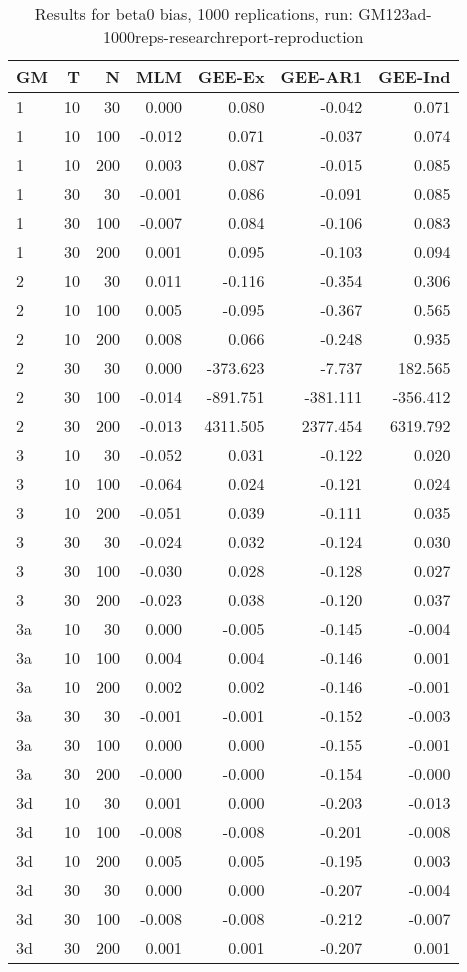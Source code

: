 \begin{table}[ht]
\centering
\begin{tabular}{lrrrrrr}
  \hline
GM & T & N & MLM & GEE-Ex & GEE-AR1 & GEE-Ind \\ 
  \hline
1 & 10 & 30 & 0.000 & 0.080 & -0.042 & 0.071 \\ 
  1 & 10 & 100 & -0.012 & 0.071 & -0.037 & 0.074 \\ 
  1 & 10 & 200 & 0.003 & 0.087 & -0.015 & 0.085 \\ 
  1 & 30 & 30 & -0.001 & 0.086 & -0.091 & 0.085 \\ 
  1 & 30 & 100 & -0.007 & 0.084 & -0.106 & 0.083 \\ 
  1 & 30 & 200 & 0.001 & 0.095 & -0.103 & 0.094 \\ 
  2 & 10 & 30 & 0.011 & -0.116 & -0.354 & 0.306 \\ 
  2 & 10 & 100 & 0.005 & -0.095 & -0.367 & 0.565 \\ 
  2 & 10 & 200 & 0.008 & 0.066 & -0.248 & 0.935 \\ 
  2 & 30 & 30 & 0.000 & -373.623 & -7.737 & 182.565 \\ 
  2 & 30 & 100 & -0.014 & -891.751 & -381.111 & -356.412 \\ 
  2 & 30 & 200 & -0.013 & 4311.505 & 2377.454 & 6319.792 \\ 
  3 & 10 & 30 & -0.052 & 0.031 & -0.122 & 0.020 \\ 
  3 & 10 & 100 & -0.064 & 0.024 & -0.121 & 0.024 \\ 
  3 & 10 & 200 & -0.051 & 0.039 & -0.111 & 0.035 \\ 
  3 & 30 & 30 & -0.024 & 0.032 & -0.124 & 0.030 \\ 
  3 & 30 & 100 & -0.030 & 0.028 & -0.128 & 0.027 \\ 
  3 & 30 & 200 & -0.023 & 0.038 & -0.120 & 0.037 \\ 
  3a & 10 & 30 & 0.000 & -0.005 & -0.145 & -0.004 \\ 
  3a & 10 & 100 & 0.004 & 0.004 & -0.146 & 0.001 \\ 
  3a & 10 & 200 & 0.002 & 0.002 & -0.146 & -0.001 \\ 
  3a & 30 & 30 & -0.001 & -0.001 & -0.152 & -0.003 \\ 
  3a & 30 & 100 & 0.000 & 0.000 & -0.155 & -0.001 \\ 
  3a & 30 & 200 & -0.000 & -0.000 & -0.154 & -0.000 \\ 
  3d & 10 & 30 & 0.001 & 0.000 & -0.203 & -0.013 \\ 
  3d & 10 & 100 & -0.008 & -0.008 & -0.201 & -0.008 \\ 
  3d & 10 & 200 & 0.005 & 0.005 & -0.195 & 0.003 \\ 
  3d & 30 & 30 & 0.000 & 0.000 & -0.207 & -0.004 \\ 
  3d & 30 & 100 & -0.008 & -0.008 & -0.212 & -0.007 \\ 
  3d & 30 & 200 & 0.001 & 0.001 & -0.207 & 0.001 \\ 
   \hline
\end{tabular}
\caption{Results for beta0 bias, 1000 replications, run: GM123ad-1000reps-researchreport-reproduction} 
\label{tab:beta0_bias}
\end{table}

